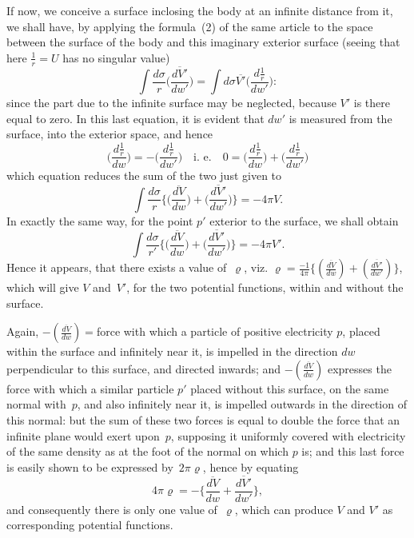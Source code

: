\documentclass[11pt,notitlepage]{amsart}
\renewcommand{\rho}{\varrho}
\begin{document}
If now, we conceive a surface inclosing the body at an infinite distance
from it, we shall have, by applying the formula~(2) of the same article
to the space between the surface of the body and this imaginary exterior
surface (seeing that here $\frac1r=U$ has no singular value)
\[
\int \frac{d\sigma}{r}\biggl(\frac{\overline{dV'}}{dw'}\biggr)=
\int d\sigma\overline{V'}\biggl(\frac{d\frac1r}{dw'}\biggr):
\]
since the part due to the infinite surface may be neglected, because $V'$ is
there equal to zero. In this last equation, it is evident that $dw'$ is measured
from the surface, into the exterior space, and hence
\[
\biggl(\frac{d\frac1r}{dw}\biggr)=-\biggl(\frac{d\frac1r}{dw'}\biggr)
\quad\text{i.~e.}\quad
0=\biggl(\frac{d\frac1r}{dw}\biggr)+\biggl(\frac{d\frac1r}{dw'}\biggr)
\]
which equation reduces the sum of the two just given to
\[
\int \frac{d\sigma}{r}\biggl\{
  \biggl(\frac{\overline{dV}}{dw}\biggr)
  +\biggl(\frac{\overline{dV'}}{dw'}\biggr)
\biggr\}=-4\pi V.
\]
In exactly the same way, for the point $p'$ exterior to the surface, we shall
obtain
\[
\int \frac{d\sigma}{r'}\biggl\{
  \biggl(\frac{\overline{dV}}{dw}\biggr)
  +\biggl(\frac{\overline{dV'}}{dw'}\biggr)
\biggr\}=-4\pi V'.
\]
Hence it appears, that there exists a value of~$\rho$,
viz. $\rho=\frac{-1}{4\pi}\{
  (\frac{\overline{dV}}{dw})+(\frac{\overline{dV'}}{dw'})\}$,
which will give $V$ and~$V'$, for the two potential functions,
within and without the surface.

Again, $-(\frac{\overline{dV}}{dw})=$force 
with which a particle of positive electricity $p$,
placed within the surface and infinitely near it,
is impelled in the direction $dw$
perpendicular to this surface,
and directed inwards; and $-(\frac{\overline{dV}}{dw})$ expresses
the force with which a similar particle $p'$ placed without this surface, on
the same normal with~$p$, and also infinitely near it, is impelled outwards in
the direction of this normal: but the sum of these two forces is equal to
double the force that an infinite plane would exert upon~$p$,
supposing it uniformly covered with electricity
of the same density as at the foot of the
normal on which $p$ is; and this last force is easily shown to be expressed
by~$2\pi\rho$, hence by equating
\[
\tag{4.}
4\pi\rho = -\biggl\{
  \frac{\overline{dV}}{dw}+\frac{\overline{dV'}}{dw'}
\biggr\},
\]
and consequently there is only one value of~$\rho$,
which can produce $V$ and $V'$
as corresponding potential functions.
\end{document}
